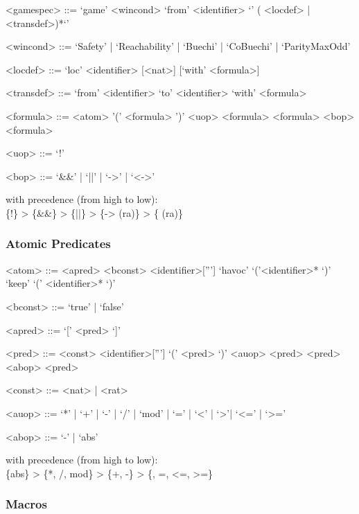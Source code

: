 \begin{grammar}

<gamespec>  ::= `game' <wincond> `from' <identifier> `{' ( <locdef> | <transdef>)*`}' 

<wincond>  ::= `Safety' | `Reachability' | `Buechi'  | `CoBuechi' | `ParityMaxOdd'

<locdef>   ::= `loc' <identifier> [<nat>] [`with' <formula>]

<transdef>  ::= `from'  <identifier> `to' <identifier> `with' <formula>


\medskip

<formula>    ::=  <atom>  \alt '(' <formula> ')' \alt <uop> <formula> \alt <formula> <bop> <formula> 

<uop>      ::=  `!' 

<bop>      ::=  `&&' | `||' | `->' | `<->'

\end{grammar}
\noindent
with precedence (from high to low):\\
\textsf{ \{!\} > \{\&\&\} > \{||\} > \{-> (ra)\} > \{<-> (ra)\}} 


\subsubsection{Atomic Predicates}

\begin{grammar}

<atom>   ::=  <apred> \alt <bconst> \alt  <identifier>['''] \alt `havoc' `('<identifier>* `)' \alt `keep' `(' 
<identifier>* `)'

<bconst>  ::= `true'  | `false'

<apred>   ::= `[' <pred> `]'

<pred>    ::= <const> \alt <identifier>['''] \alt `(' <pred> `)' \alt <auop> <pred> \alt <pred> <abop> <pred>

<const>   ::= <nat>   | <rat>

<auop>    ::= `*' | `+' | `-' | `/' | `mod' | `=' | `<' | `>'| `<=' | `>='

<abop>   ::= `-' | `abs'

\end{grammar}

\noindent
with precedence (from high to low):\\
\textsf{    \{abs\} > \{*, /, mod\} > \{+, -\} > \{<, >, =, <=, >=\}}


\subsubsection{Macros}


